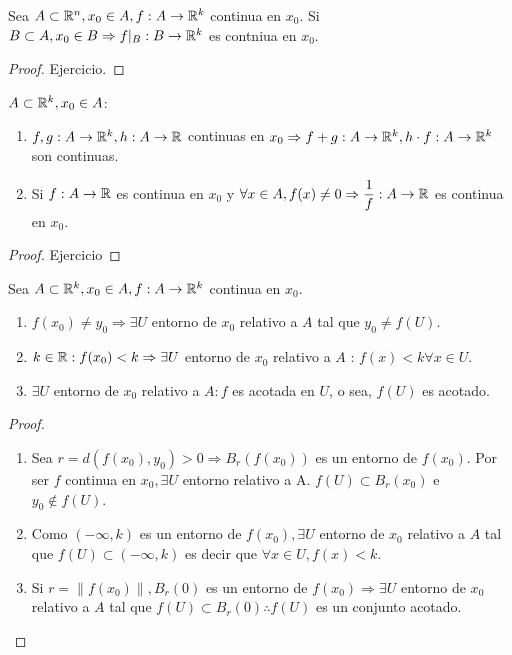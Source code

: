 \begin{prop}
  Sea $A \subset \mathbb{R}^n, x_0 \in A, f: A \to \mathbb{R}^k$ continua en $x_0$. Si $B \subset A, x_0 \in B \Rightarrow f|_B: B \to \mathbb{R}^k$ es contniua en $x_0$.
  \begin{proof}
    Ejercicio.
  \end{proof}
\end{prop}

\begin{prop}
  $A \subset \mathbb{R}^k, x_0 \in A$:
  \begin{enumerate}
    \item $f, g: A \to \mathbb{R}^k, h: A \to \mathbb{R}$ continuas en $x_0 \Rightarrow f+g: A \to \mathbb{R}^k, h \cdot f: A \to \mathbb{R}^k$ son continuas.
    \item Si $f: A \to \mathbb{R}$ es continua en $x_0$ y $\forall x \in A, f(x) \neq 0 \Rightarrow \dfrac{1}{f}: A \to \mathbb{R}$ es continua en $x_0$.
  \end{enumerate}

  \begin{proof}
    Ejercicio
  \end{proof}
\end{prop}

\begin{prop}
  Sea $A \subset \mathbb{R}^k, x_0 \in A, f: A \to \mathbb{R}^k$ continua en $x_0$.
  \begin{enumerate}
    \item $f(x_0) \neq y_0 \Rightarrow \exists U$ entorno de $x_0$ relativo a $A$ tal que $y_0 \neq f(U)$.
    \item $k \in \mathbb{R} : f(x_0) < k \Rightarrow \exists U$ entorno de $x_0$ relativo a $A$ : $f(x) < k \forall x \in U$.
    \item $\exists U$ entorno de $x_0$ relativo a $A : f$ es acotada en $U$, o sea, $f(U)$ es acotado. 
  \end{enumerate}

  \begin{proof}
    \begin{enumerate}
      \item Sea $r = d(f(x_0), y_0) > 0 \Rightarrow B_r(f(x_0))$ es un entorno de $f(x_0)$. Por ser $f$ continua en $x_0, \exists U$ entorno relativo a A. $f(U) \subset B_r(x_0)$ e $y_0 \notin f(U)$.
      \item Como $(-\infty, k)$ es un entorno de $f(x_0), \exists U$ entorno de $x_0$ relativo a $A$ tal que $f(U) \subset (-\infty, k)$ es decir que $\forall x \in U, f(x) < k$.
      \item Si $r = \|f(x_0)\|, B_r(0)$ es un entorno de $f(x_0) \Rightarrow \exists U$ entorno de $x_0$ relativo a $A$ tal que $f(U) \subset B_r(0) \therefore f(U)$ es un conjunto acotado.
    \end{enumerate}
  \end{proof}
\end{prop}

